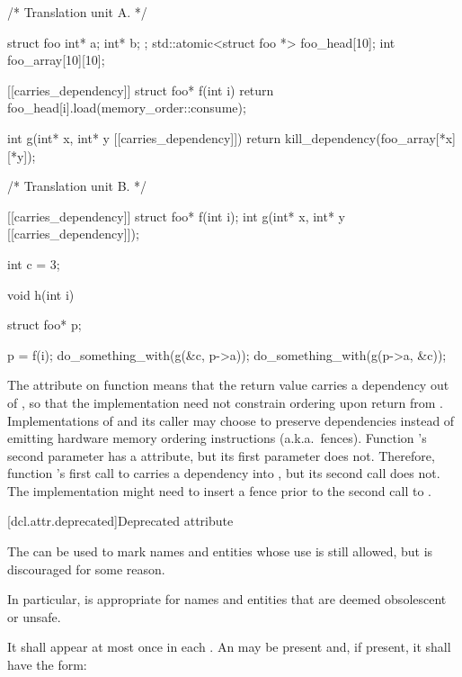 \pnum
\begin{example}
\begin{codeblock}
/* Translation unit A. */

struct foo { int* a; int* b; };
std::atomic<struct foo *> foo_head[10];
int foo_array[10][10];

[[carries_dependency]] struct foo* f(int i) {
  return foo_head[i].load(memory_order::consume);
}

int g(int* x, int* y [[carries_dependency]]) {
  return kill_dependency(foo_array[*x][*y]);
}

/* Translation unit B. */

[[carries_dependency]] struct foo* f(int i);
int g(int* x, int* y [[carries_dependency]]);

int c = 3;

void h(int i) {
  struct foo* p;

  p = f(i);
  do_something_with(g(&c, p->a));
  do_something_with(g(p->a, &c));
}
\end{codeblock}

The  attribute on function  means that the
return value carries a dependency out of , so that the implementation
need not constrain ordering upon return from . Implementations of
 and its caller may choose to preserve dependencies instead of emitting
hardware memory ordering instructions (a.k.a.\ fences).
Function 's second parameter has a  attribute,
but its first parameter does not. Therefore, function 's first call to
 carries a dependency into , but its second call does not. The
implementation might need to insert a fence prior to the second call to
.
\end{example}%
%

[dcl.attr.deprecated]{Deprecated attribute}%

\pnum
The   can be used to mark names and entities
whose use is still allowed, but is discouraged for some reason. \begin{note} In particular,
 is appropriate for names and entities that are deemed obsolescent or
unsafe. \end{note} It shall appear at most once in each . An
 may be present and, if present, it shall have the form:


